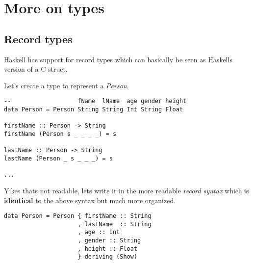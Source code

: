 \section{More on types}

\subsection{Record types}
Haskell has support for record types which can basically be seen as Haskells version of a C struct.

Let's create a type to represent a \emph{Person}.

\begin{lstlisting}
--                   fName  lName  age gender height
data Person = Person String String Int String Float

firstName :: Person -> String
firstName (Person s _ _ _ _) = s

lastName :: Person -> String
lastName (Person _ s _ _ _) = s

...
\end{lstlisting}

Yikes thats not readable, lets write it in the more readable \emph{record syntax} which is \textbf{identical} to the above syntax but much more organized.

\begin{lstlisting}
data Person = Person { firstName :: String
                     , lastName  :: String
                     , age :: Int
                     , gender :: String
                     , height :: Float
                     } deriving (Show)
\end{lstlisting}

